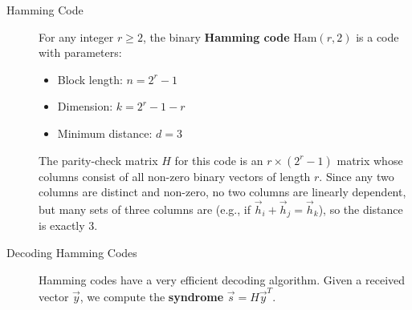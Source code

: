 \begin{description}
    \item[Hamming Code] For any integer $r \ge 2$, the binary \textbf{Hamming code} $\text{Ham}(r, 2)$ is a code with parameters:
    \begin{itemize}
        \item Block length: $n = 2^r - 1$
        \item Dimension: $k = 2^r - 1 - r$
        \item Minimum distance: $d = 3$
    \end{itemize}
    The parity-check matrix $H$ for this code is an $r \times (2^r-1)$ matrix whose columns consist of all non-zero binary vectors of length $r$. Since any two columns are distinct and non-zero, no two columns are linearly dependent, but many sets of three columns are (e.g., if $\vec{h}_i + \vec{h}_j = \vec{h}_k$), so the distance is exactly 3.

    \item[Decoding Hamming Codes] Hamming codes have a very efficient decoding algorithm. Given a received vector $\vec{y}$, we compute the \textbf{syndrome} $\vec{s} = H\vec{y}^T$.
\end{description}

